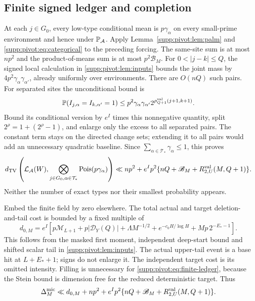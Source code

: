 \subsection{Finite signed ledger and completion}
At each $j\in G_0$, every low-type conditional mean is $p\gamma_\alpha$ on every small-prime environment and hence under $\mathbb P_{\mathcal A}$.
Apply Lemma~\ref{supp:pivot:lem:palm} and \eqref{supp:pivot:eq:categorical} to the preceding forcing.
The same-site sum is at most $np^2$ and the product-of-means sum is at most $p^2\mathscr B_M$.
For $0<|j-k|\le Q$, the signed local calculation in \cref{supp:pivot:lem:inputs} bounds the joint mass by $4p^2\gamma_\alpha\gamma_{\alpha'}$, already uniformly over environments. There are $O(nQ)$ such pairs.
For separated sites the unconditional bound is
\[
 \mathbb P(I_{j,\alpha}=I_{k,\alpha'}=1)
 \le p^2\gamma_\alpha\gamma_{\alpha'}
       2^{\rho^{\rm val}_{Q+1}(j+1,k+1)}.
\]
Bound its conditional version by $e^I$ times this nonnegative quantity, split $2^\rho=1+(2^\rho-1)$, and enlarge only the excess to all separated pairs. The constant term
stays on the directed change sets; extending it to all pairs would add
an unnecessary quadratic baseline. Since $\sum_{\alpha\in\mathcal T_*}\gamma_\alpha\le1$, this proves
\begin{equation}\label{supp:pivot:eq:finite-ledger}
 d_{\mathrm{TV}}\left(\mathcal L_{\mathcal A}(W),
             \bigotimes_{j\in G_0,\alpha\in\mathcal T_*}\operatorname{Pois}(p\gamma_\alpha)\right)
 \ll np^2+e^Ip^2\{nQ+\mathscr B_M+R^{\rm val}_{2,U}(M,Q+1)\}.
\end{equation}
Neither the number of exact types nor their smallest probability appears.

Embed the finite field by zero elsewhere. The total actual and target deletion-and-tail cost is bounded by a fixed multiple of
\begin{equation}\label{supp:pivot:eq:deletion}
 d_{0,M}=e^I\left[
 p\mathcal M_{L+1}+p|\mathcal D_Y(Q)|+\Lambda M^{-1/2}
 +e^{-c_0H/\log H}+Mp\,2^{-E_*-1}\right].
\end{equation}
This follows from the masked first moment, independent deep-start bound and shifted scalar tail in \cref{supp:pivot:lem:inputs}. The actual upper-tail event is a base hit at $L+E_*+1$; signs do not enlarge it. The independent target cost is its omitted intensity. Filling is unnecessary for \eqref{supp:pivot:eq:finite-ledger}, because the Stein bound is dimension free for the reduced deterministic target. Thus
\begin{equation}\label{supp:pivot:eq:complete-ledger}
 \Delta_M^{\rm mic}\ll d_{0,M}+np^2+
        e^Ip^2\{nQ+\mathscr B_M+R^{\rm val}_{2,U}(M,Q+1)\}.
\end{equation}

